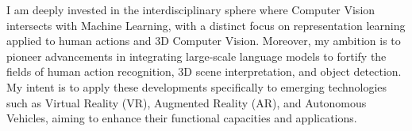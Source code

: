 


\begin{cventries}

\cvtext
{ %
\begin{cvitems}
    I am deeply invested in the interdisciplinary sphere where Computer Vision intersects with Machine Learning, with a distinct focus on representation learning applied to human actions and 3D Computer Vision. 
    Moreover, my ambition is to pioneer advancements in integrating large-scale language models to fortify the fields of human action recognition, 3D scene interpretation, and object detection. My intent is to apply these developments specifically to emerging technologies such as Virtual Reality (VR), Augmented Reality (AR), and Autonomous Vehicles, aiming to enhance their functional capacities and applications.
\end{cvitems}
}


\end{cventries}
